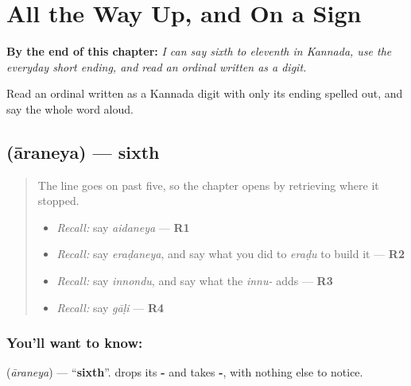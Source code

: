 
\chapter{All the Way Up, and On a Sign}
\label{ch:ka-ordinals-to-tenth}

\begin{chapteropening}
\textbf{By the end of this chapter:} \emph{I can say sixth to eleventh in Kannada, use the everyday short ending, and read an ordinal written as a digit.}

Read an ordinal written as a Kannada digit with only its ending spelled out, and say the whole word aloud.
\end{chapteropening}

\section[\texorpdfstring{\kn{ಆರನೆಯ} (āraneya)}{ಆರನೆಯ (āraneya)}]{ (āraneya) — sixth}

\label{lesson:KA-C75-sixth}



\begin{quote}
The line goes on past five, so the chapter opens by retrieving where it stopped.

\begin{itemize}
\raggedright
  \item \emph{Recall:} say \emph{aidaneya} — \textbf{R1}
  \item \emph{Recall:} say \emph{eraḍaneya}, and say what you did to \emph{eraḍu} to build it — \textbf{R2}
  \item \emph{Recall:} say \emph{innondu}, and say what the \emph{innu-} adds — \textbf{R3}
  \item \emph{Recall:} say \emph{gāḷi} — \textbf{R4}
\end{itemize}
\end{quote}

\subsection*{You'll want to know: }
\textbf{} (\emph{āraneya}) — \textquotedblleft{}\textbf{sixth}\textquotedblright{}. \textbf{} drops its \textbf{-} and takes \textbf{-}, with nothing else to notice.

